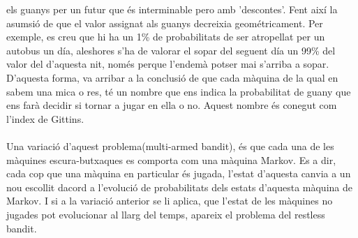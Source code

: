 els guanys per un futur que és interminable pero amb 'descontes'. 
Fent així la asumsió de que el valor assignat als guanys decreixia 
geométricament. Per exemple, es creu que hi ha un 1\% de probabilitats de 
ser atropellat per un autobus un día, aleshores s'ha de valorar el sopar del
seguent día un 99\% del valor del d'aquesta nit, només perque l'endemà potser mai
s'arriba a sopar. D'aquesta forma, va arribar a la conclusió de que cada màquina 
de la qual en sabem una mica o res, té un nombre que ens indica la probabilitat
de guany que ens farà decidir si tornar a jugar en ella o no. Aquest
nombre és conegut com l'index de Gittins.\\\\
Una variació d'aquest problema(multi-armed bandit), és que cada una de 
les màquines escura-butxaques es comporta com una màquina Markov. Es a dir,
cada cop que una màquina en particular és jugada, l'estat d'aquesta canvia
a un nou escollit dacord a l'evolució de probabilitats dels estats d'aquesta màquina de Markov.
I si a la variació anterior se li aplica, que l'estat de les màquines no jugades 
pot evolucionar al llarg del temps, apareix el problema del restless bandit.  

